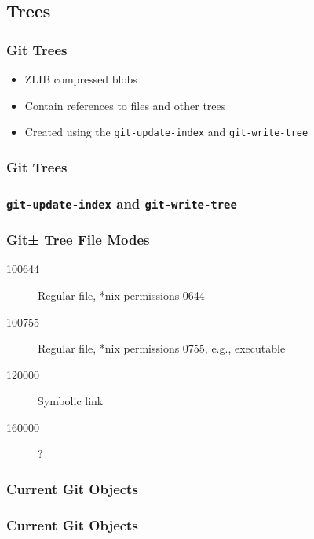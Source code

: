 \documentclass{beamer}
\begin{document}
\subsection{Trees}

\begin{frame}
\frametitle{Git Trees}
\begin{itemize}
\item{ZLIB compressed blobs}
\item{Contain references to files and other trees}
\item{Created using the \texttt{git-update-index} and \texttt{git-write-tree}}
\end{itemize}
\end{frame}

\begin{frame}
\frametitle{Git Trees}
\begin{figure}
\end{figure}
\end{frame}

\begin{frame}[fragile]
\frametitle{\texttt{git-update-index} and \texttt{git-write-tree}}

\end{frame}

\begin{frame}
\frametitle{Git± Tree File Modes}
\begin{description}
\item[100644]{Regular file, *nix permissions 0644}
\item[100755]{Regular file, *nix permissions 0755, e.g., executable}
\item[120000]{Symbolic link}
\item[160000]{?}
\end{description}
\end{frame}

\begin{frame}[fragile]
\frametitle{Current Git Objects}

\end{frame}

\begin{frame}
\frametitle{Current Git Objects}
\begin{figure}
\end{figure}
\end{frame}
\end{document}
